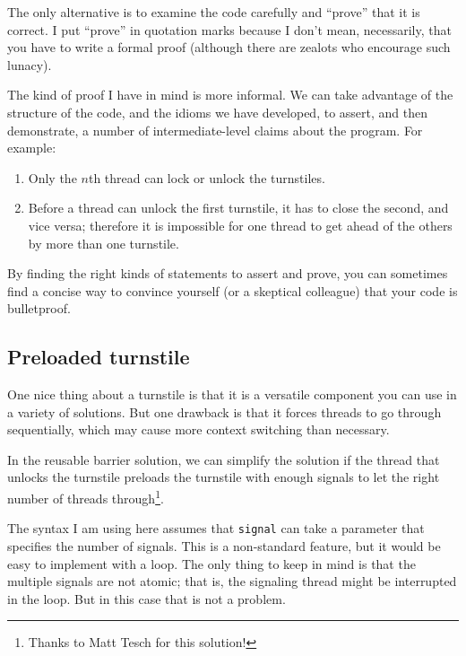 \documentclass{book}
\begin{document}
The only alternative is to examine the code carefully and
``prove'' that it is correct.  I put ``prove'' in quotation
marks because I don't mean, necessarily, that you have to write
a formal proof (although there are zealots who encourage
such lunacy).

The kind of proof I have in mind is more informal.  We can take
advantage of the structure of the code, and the idioms we have
developed, to assert, and then demonstrate, a number of
intermediate-level claims about the program.  For example:

\begin{enumerate}

    \item Only the $n$th thread can lock or unlock the turnstiles.

    \item Before a thread can unlock the first turnstile, it has to close
          the second, and vice versa; therefore it is impossible for one thread
          to get ahead of the others by more than one turnstile.

\end{enumerate}

By finding the right kinds of statements to assert and
prove, you can sometimes find a concise way to convince yourself
(or a skeptical colleague) that your code is bulletproof.




\subsection {Preloaded turnstile}

One nice thing about a turnstile is that it is a versatile
component you can use in a variety of solutions.  But one
drawback is that it forces threads to go through sequentially,
which may cause more context switching than necessary.

In the reusable barrier solution, we can simplify the solution if the
thread that unlocks the turnstile preloads the turnstile with enough
signals to let the right number of threads through\footnote{Thanks to
    Matt Tesch for this solution!}.

The syntax I am using here assumes that {\tt signal} can take a
parameter that specifies the number of signals.  This is a
non-standard feature, but it would be easy to implement with a loop.
The only thing to keep in mind is that the multiple signals are not
atomic; that is, the signaling thread might be interrupted in the
loop.  But in this case that is not a problem.
\end{document}
